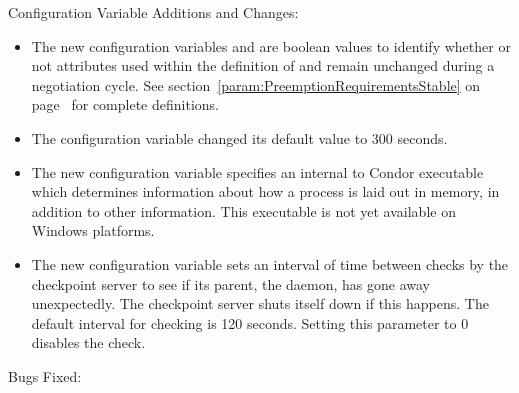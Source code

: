 \noindent Configuration Variable Additions and Changes:

\begin{itemize}

\item The new configuration variables 
  and  are boolean values to
  identify whether or not attributes used within the definition of
   and  remain
  unchanged during a negotiation cycle.
  See section~\ref{param:PreemptionRequirementsStable} on
  page~\pageref{param:PreemptionRequirementsStable} for 
  complete definitions.

\item The configuration variable 
  changed its default value to 300 seconds.

\item The new configuration variable  
specifies an internal to Condor
executable which determines information about how a process is laid out
in memory, in addition to other information. This executable is not yet
available on Windows platforms.

\item The new configuration variable 
 sets an interval
of time between checks by the checkpoint server to see if 
its parent, the  daemon, has gone away unexpectedly.
The checkpoint server shuts itself down if this happens.
The default interval for checking is 120 seconds.
Setting this parameter to 0 disables the check.

\end{itemize}

\noindent Bugs Fixed:

